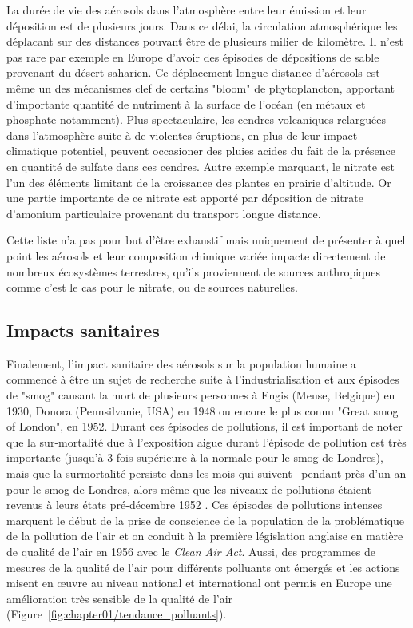 La durée de vie des aérosols dans l'atmosphère entre leur émission et leur déposition est
de plusieurs jours. Dans ce délai, la circulation atmosphérique les déplacant sur des
distances pouvant être de plusieurs milier de kilomètre. Il n'est pas rare par exemple en
Europe d'avoir des épisodes de dépositions de sable provenant du désert saharien. Ce
déplacement longue distance d'aérosols est même un des mécanismes clef de certains "bloom"
de phytoplancton, apportant d'importante quantité de nutriment à la surface de l'océan (en
métaux et phosphate notamment).
Plus spectaculaire, les cendres volcaniques relarguées dans l'atmosphère suite à de
violentes éruptions, en plus de leur impact climatique potentiel, peuvent occasioner des
pluies acides du fait de la présence en quantité de sulfate dans ces cendres.
Autre exemple marquant, le nitrate est l'un des éléments limitant de la croissance des
plantes en prairie d'altitude. Or une partie importante de ce nitrate est apporté par
déposition de nitrate d'amonium particulaire provenant du transport longue distance.

Cette liste n'a pas pour but d'être exhaustif mais uniquement de présenter à quel point
les aérosols et leur composition chimique variée impacte directement de nombreux
écosystèmes terrestres, qu'ils proviennent de sources anthropiques comme c'est le cas pour le
nitrate, ou de sources naturelles.

\subsection{Impacts sanitaires}%
\label{sub:impacts_sanitaires}

Finalement, l'impact sanitaire des aérosols sur la population humaine a commencé à être
un sujet de recherche suite à l'industrialisation et aux épisodes de "smog" causant la
mort de plusieurs personnes à Engis (Meuse, Belgique) en 1930, Donora (Pennsilvanie, USA)
en 1948 ou encore le plus connu "Great smog of London", en 1952. Durant ces épisodes de
pollutions, il est important de noter que la sur-mortalité due à l'exposition aigue durant
l'épisode de pollution est très importante (jusqu'à 3 fois supérieure à la normale pour le
smog de Londres), mais que la surmortalité persiste dans les mois qui suivent --pendant
près d'un an pour le smog de Londres, alors même que les niveaux de pollutions étaient
revenus à leurs états pré-décembre 1952 \autocite{bellReassessment2001}.
Ces épisodes de pollutions intenses marquent le début de la prise de conscience de la
population de la problématique de la pollution de l'air et on conduit à la première
législation anglaise en matière de qualité de l'air en 1956 avec le \textit{Clean Air
Act}. Aussi, des programmes de mesures de la qualité de l'air pour différents polluants
ont émergés et les actions misent en œuvre au niveau national et international ont permis
en Europe une amélioration très sensible de la qualité de l'air (Figure~\ref{fig:chapter01/tendance_polluants}).

